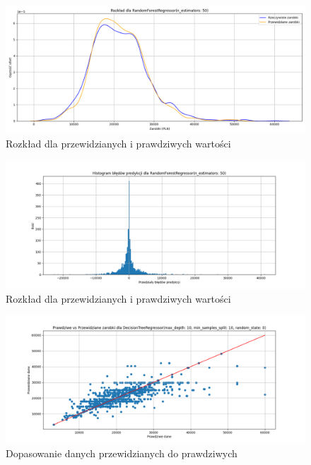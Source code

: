 \documentclass[a4paper]{article}
\begin{document}
\begin{figure}[H]
    \centering
    \includegraphics[width=\textwidth]{../analysis/plots/wyniki/0.6&0.4/RandomForestRegressor/salary_dist.png}
    \caption{Rozkład dla przewidzianych i prawdziwych wartości}
\end{figure}

\begin{figure}[H]
    \centering
    \includegraphics[width=\textwidth]{../analysis/plots/wyniki/0.6&0.4/RandomForestRegressor/errors.png}
    \caption{Rozkład dla przewidzianych i prawdziwych wartości}
\end{figure}

\begin{figure}[H]
    \centering
    \includegraphics[width=\textwidth]{../analysis/plots/wyniki/0.6&0.4/DecisionTreeRegressor/scatter.png}
    \caption{Dopasowanie danych przewidzianych do prawdziwych}
\end{figure}
\end{document}
